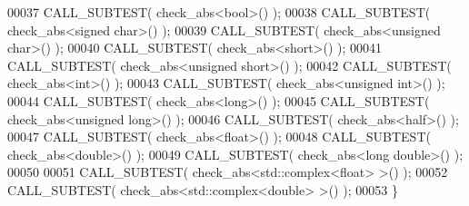 \begin{DoxyCode}
00037   CALL\_SUBTEST( check\_abs<bool>() );
00038   CALL\_SUBTEST( check\_abs<signed char>() );
00039   CALL\_SUBTEST( check\_abs<unsigned char>() );
00040   CALL\_SUBTEST( check\_abs<short>() );
00041   CALL\_SUBTEST( check\_abs<unsigned short>() );
00042   CALL\_SUBTEST( check\_abs<int>() );
00043   CALL\_SUBTEST( check\_abs<unsigned int>() );
00044   CALL\_SUBTEST( check\_abs<long>() );
00045   CALL\_SUBTEST( check\_abs<unsigned long>() );
00046   CALL\_SUBTEST( check\_abs<half>() );
00047   CALL\_SUBTEST( check\_abs<float>() );
00048   CALL\_SUBTEST( check\_abs<double>() );
00049   CALL\_SUBTEST( check\_abs<long double>() );
00050 
00051   CALL\_SUBTEST( check\_abs<std::complex<float> >() );
00052   CALL\_SUBTEST( check\_abs<std::complex<double> >() );
00053 \}
\end{DoxyCode}
